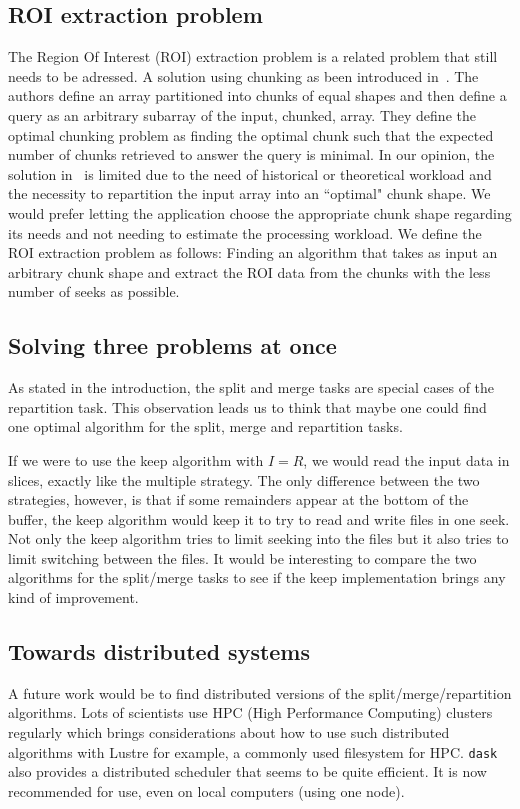 \documentclass[conference]{IEEEtran}
\begin{document}
\subsection{ROI extraction problem}
The Region Of Interest (ROI) extraction problem is a related problem that still needs
to be adressed. A solution using chunking as been introduced in~\cite{optimal_chuking}. The authors
define an array partitioned into chunks of equal shapes and then define a
query as an arbitrary subarray of the input, chunked, array. They define the
optimal chunking problem as finding the optimal chunk such that the expected
number of chunks retrieved to answer the query is minimal. In our opinion, the
solution in~\cite{optimal_chuking} is limited due to the need of historical or theoretical workload
and the necessity to repartition the input array into an ``optimal" chunk shape. We
would prefer letting the application choose the appropriate chunk shape
regarding its needs and not needing to estimate the processing workload. We
define the ROI extraction problem as follows: Finding an algorithm that takes
as input an arbitrary chunk shape and extract the ROI data from the chunks with
the less number of seeks as possible.

\subsection{Solving three problems at once}
As stated in the introduction, the split and merge tasks are special cases of
the repartition task. This observation leads us to think that maybe one could find
one optimal algorithm for the split, merge and repartition tasks.

If we were to use the keep algorithm with $I=R$, we would read the input data
in slices, exactly like the multiple strategy. The only difference between the
two strategies, however, is that if some remainders appear at the bottom of the
buffer, the keep algorithm would keep it to try to read and write files in one
seek. Not only the keep algorithm tries to limit seeking into the files but it
also tries to limit switching between the files. It would be interesting to
compare the two algorithms for the split/merge tasks to see if the keep
implementation brings any kind of improvement.

\subsection{Towards distributed systems}
A future work would be to find distributed versions of the split/merge/repartition
algorithms. Lots of scientists use HPC (High Performance Computing) clusters
regularly which brings considerations about how to use such distributed
algorithms with Lustre for example, a commonly used filesystem for HPC. \texttt{dask}
also provides a distributed scheduler that seems to be quite efficient. It is
now recommended for use, even on local computers (using one node).
\end{document}
